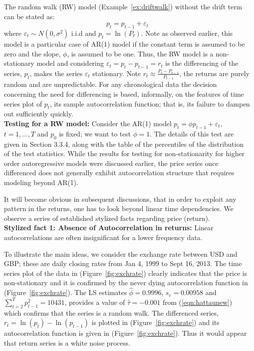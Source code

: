 The random walk (RW) model (Example~\ref{ex:driftwalk}) without the drift term can be stated as:
	\begin{equation}\label{eqn:2pteq}
	p_t = p_{t-1} + \varepsilon_t
	\end{equation}
where $\varepsilon_t \sim N(0,\sigma^2)$ i.i.d and $p_t = \ln{(P_t)}$. Note as observed earlier, this model is a particular case of AR(1) model if the constant term is assumed to be zero and the slope, $\phi$, is assumed to be one. Thus, the RW model is a non-stationary model and considering $\varepsilon_t = p_t - p_{t-1}=r_t$ is the differencing of the series, $p_t$, makes the series $\varepsilon_t$ stationary. Note $r_t \approx \frac{P_t - P_{t-1}}{P_{t-1}}$,  the returns are purely random and are unpredictable. For any chronological data the decision concerning the need for differencing is based, informally, on the features of time series plot of $p_t$, its sample autocorrelation function; that is, its failure to dampen out sufficiently quickly. \\


\noindent\textbf{Testing for a RW model:} Consider the AR(1) model $p_t = \phi p_{t-1} + \varepsilon_t$, $t = 1,\ldots,T$ and $p_0$ is fixed; we want to test $\phi = 1$. The details of this test are given in Section 3.3.4, along with the table of the percentiles of the distribution of the test statistics. While the results for testing for non-stationarity for higher order autoregressive models were discussed earlier, the price series once differenced does not generally exhibit autocorrelation structure that requires modeling beyond AR(1).


It will become obvious in subsequent discussions, that in order to exploit any pattern in the returns, one has to look beyond linear time dependencies. We observe a series of established stylized facts regarding price (return). \\


\noindent\textbf{Stylized fact 1: Absence of Autocorrelation in returns:} Linear autocorrelations are often insignificant for a lower frequency data. 


To illustrate the main ideas, we consider the exchange rate between USD and GBP; these are daily closing rates from Jan 4, 1999 to Sept 16, 2013. The time series plot of the data in (Figure~\ref{fig:exchrate}) clearly indicates that the price is non-stationary and it is confirmed by the never dying autocorrelation function in (Figure~\ref{fig:exchrate}). The LS estimates $\hat{\phi}= 0.9996$, $s_e= 0.00958$ and $\sum_{t=2}^Tp_{t-1}^2= 10431$, provides a value of $\hat{\tau} = -0.001$ from (\ref{eqn:hattaunew}) which confirms that the series is a random walk. The differenced series, $r_t = \ln{(p_t)} - \ln{(p_{t-1})}$ is plotted in (Figure~\ref{fig:exchrate}) and its autocorrelation function is given in (Figure~\ref{fig:exchrate}). Thus it would appear that return series is a white noise process.


